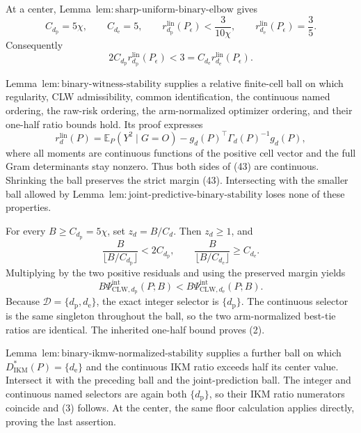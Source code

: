 At a center, Lemma~\(\mathrm{lem{:}sharp\text{-}uniform\text{-}binary\text{-}elbow}\) gives
\[
 C_{d_{\mathrm p}}=5\chi,
 \qquad C_{d_{\mathrm e}}=5,
 \qquad
 r_{d_{\mathrm p}}^{\mathrm{lin}}(P_\epsilon)<\frac3{10\chi},
 \qquad
 r_{d_{\mathrm e}}^{\mathrm{lin}}(P_\epsilon)=\frac35.
\]
Consequently
\[
 2C_{d_{\mathrm p}}r_{d_{\mathrm p}}^{\mathrm{lin}}(P_\epsilon)
 <3=C_{d_{\mathrm e}}r_{d_{\mathrm e}}^{\mathrm{lin}}(P_\epsilon). \tag{43}
\]

Lemma~\(\mathrm{lem{:}binary\text{-}witness\text{-}stability}\) supplies a relative finite-cell ball on which regularity, CLW admissibility, common identification, the continuous named ordering, the raw-risk ordering, the arm-normalized optimizer ordering, and their one-half ratio bounds hold.  Its proof expresses
\[
 r_d^{\mathrm{lin}}(P)=
 \mathbb E_P(Y^2\mid G=O)-g_d(P)^\top\Gamma_d(P)^{-1}g_d(P),
\]
where all moments are continuous functions of the positive cell vector and the full Gram determinants stay nonzero.  Thus both sides of (43) are continuous.  Shrinking the ball preserves the strict margin (43).  Intersecting with the smaller ball allowed by Lemma~\(\mathrm{lem{:}joint\text{-}predictive\text{-}binary\text{-}stability}\) loses none of these properties.

For every \(B\ge C_{d_{\mathrm p}}=5\chi\), set \(z_d=B/C_d\).  Then \(z_d\ge1\), and
\[
 \frac{B}{\lfloor B/C_{d_{\mathrm p}}\rfloor}<2C_{d_{\mathrm p}},
 \qquad
 \frac{B}{\lfloor B/C_{d_{\mathrm e}}\rfloor}\ge C_{d_{\mathrm e}}. \tag{44}
\]
Multiplying by the two positive residuals and using the preserved margin yields
\[
 B\Psi_{\mathrm{CLW},d_{\mathrm p}}^{\mathrm{int}}(P;B)
 <B\Psi_{\mathrm{CLW},d_{\mathrm e}}^{\mathrm{int}}(P;B).
\]
Because \(\mathcal D=\{d_{\mathrm p},d_{\mathrm e}\}\), the exact integer selector is \(\{d_{\mathrm p}\}\).  The continuous selector is the same singleton throughout the ball, so the two arm-normalized best-tie ratios are identical.  The inherited one-half bound proves (2).

Lemma~\(\mathrm{lem{:}binary\text{-}ikmw\text{-}normalized\text{-}stability}\) supplies a further ball on which \(D_{\mathrm{IKM}}^*(P)=\{d_{\mathrm e}\}\) and the continuous IKM ratio exceeds half its center value.  Intersect it with the preceding ball and the joint-prediction ball.  The integer and continuous named selectors are again both \(\{d_{\mathrm p}\}\), so their IKM ratio numerators coincide and (3) follows.  At the center, the same floor calculation applies directly, proving the last assertion.
